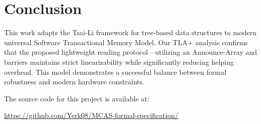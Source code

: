 \section{Conclusion}
\label{sec:conclusion}

This work adapts the Tsai-Li framework for tree-based data structures to modern universal Software Transactional Memory Model. Our TLA+ analysis confirms that the proposed lightweight reading protocol—utilizing an Announce-Array and barriers maintains strict linearizability while significantly reducing helping overhead. This model demonstrates a successful balance between formal robustness and modern hardware constraints.

The source code for this project is available at:

\url{https://github.com/Yerk08/MCAS-formal-specification/}

